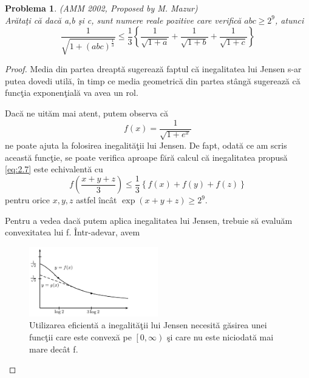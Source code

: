 \documentclass[a4paper,12pt,oneside]{report}
\newtheorem{problem}{Problema}
\begin{document}
\begin{problem}(AMM 2002, Proposed by M. Mazur)\\
Ar\u{a}ta\c{t}i c\u{a} dac\u{a} a,b \c{s}i c, sunt numere reale pozitive care verific\u{a} \(abc \geq 2^{9}\), atunci
\begin{displaymath}
  \frac{1}{\sqrt{1 + \left ( abc \right )^{\frac{1}{3}}}}\leq \frac{1}{3}\left \{ \frac{1}{\sqrt{1 + a}} + \frac{1}{\sqrt{1 + b}} + \frac{1}{\sqrt{1 + c}}\right \}     
  \label{eq:2.7} \tag{2.7}
\end{displaymath}
\end{problem}
\begin{proof}
Media din partea dreapt\u{a} sugereaz\u{a} faptul c\u{a} inegalitatea lui Jensen s-ar putea dovedi util\u{a}, \^{i}n timp ce media geometric\u{a} din partea st\^{a}ng\u{a} sugereaz\u{a} c\u{a} func\c{t}ia exponen\c{t}ial\u{a} va avea un rol.

Dac\u{a} ne uit\u{a}m mai atent, putem observa c\u{a}
\begin{displaymath}
  f\left ( x \right ) = \frac{1}{\sqrt{1+ e^{x}}}
\end{displaymath}
ne poate ajuta la folosirea inegalit\u{a}\c{t}ii lui Jensen. De fapt, odat\u{a} ce am scris aceast\u{a} func\c{t}ie, se poate verifica aproape f\u{a}r\u{a} calcul c\u{a} inegalitatea propus\u{a} \ref{eq:2.7} este echivalent\u{a} cu
\begin{displaymath}
  f\left ( \frac{x + y + z}{3} \right )\leq \frac{1}{3}\left \{ f\left ( x \right ) + f\left ( y \right ) + f\left ( z \right ) \right \}    \label{eq:2.8} \tag{2.8}
\end{displaymath}
pentru orice $x, y, z$ astfel \^{i}nc\^{a}t \(\exp\left ( x + y + z \right )\geq 2^{9}.\)

Pentru a vedea dac\u{a} putem aplica inegalitatea lui Jensen, trebuie s\u{a} evalu\u{a}m convexitatea lui f. \^{I}ntr-adevar, avem

\begin{figure}[htbp]
	\centering
	\includegraphics[width=0.5\textwidth]{fig_pb3.png}
	\caption{ Utilizarea eficient\u{a} a inegalit\u{a}\c{t}ii lui Jensen necesit\u{a} g\u{a}sirea unei func\c{t}ii care este convex\u{a} pe \(\left [ 0, \infty  \right )\)  \c{s}i care nu este niciodat\u{a} mai mare dec\^{a}t f.}
\end{figure}


\end{proof}
\end{document}
